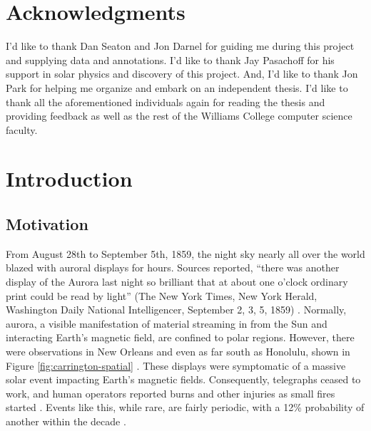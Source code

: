 \documentclass[twoside]{report}
\begin{document}
\chapter*{Acknowledgments}
I'd like to thank Dan Seaton and Jon Darnel for guiding me during this project and supplying data and annotations.  I'd like to thank Jay Pasachoff for his support in solar physics and discovery of this project. And, I'd like to thank Jon Park for helping me organize and embark on an independent thesis. I'd like to thank all the aforementioned individuals again for reading the thesis and providing feedback as well as the rest of the Williams College computer science faculty. 

\chapter{Introduction}
\section{Motivation}
From August 28th to September 5th, 1859, the night sky nearly all over the world blazed with auroral displays for hours. Sources reported, ``there was another display of the Aurora last night so brilliant that at about one o’clock ordinary print could be read by light'' (The New York Times, New York Herald, Washington Daily National Intelligencer, September 2, 3, 5, 1859) \cite{green:2006}. Normally, aurora, a visible manifestation of material streaming in from the Sun and interacting Earth's magnetic field, are confined to polar regions. However, there were observations in New Orleans and even as far south as Honolulu, shown in Figure \ref{fig:carrington-spatial}  \cite{cliver:2004}. These displays were symptomatic of a massive solar event impacting Earth's magnetic fields. Consequently, telegraphs ceased to work, and human operators reported burns and other injuries as small fires started \cite{green:2006}. Events like this, while rare, are fairly periodic, with a 12\% probability of another within the decade \cite{riley:2012}. 
\end{document}
